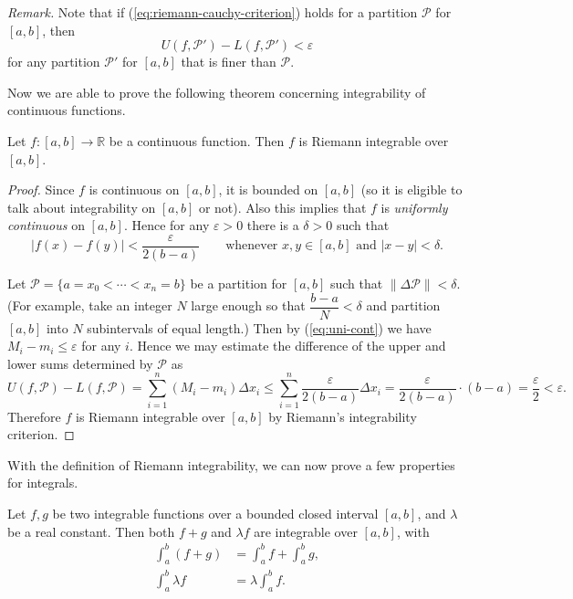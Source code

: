 \noindent\textit{Remark.} Note that if (\ref{eq:riemann-cauchy-criterion}) holds for a partition $\mathcal{P}$ for $[a,b]$, then
\[
  U(f,\mathcal{P}') - L(f,\mathcal{P}') < \varepsilon
\]
for any partition $\mathcal{P}'$ for $[a,b]$ that is finer than $\mathcal{P}$.

Now we are able to prove the following theorem concerning integrability of continuous functions.

\begin{thm}
  Let $f: [a,b] \to \mathbb{R}$ be a continuous function.
  Then $f$ is Riemann integrable over $[a,b]$.
\end{thm}

\begin{proof}
  Since $f$ is continuous on $[a,b]$, it is bounded on $[a,b]$ (so it is eligible to talk about integrability on $[a,b]$ or not).
  Also this implies that $f$ is \textit{uniformly continuous} on $[a,b]$.
  Hence for any $\varepsilon > 0$ there is a $\delta > 0$ such that 
  \begin{equation}
    \label{eq:uni-cont}
    |f(x) - f(y)| < \frac{\varepsilon}{2(b-a)} \qquad \text{whenever $x,y \in [a,b]$ and $|x-y| < \delta$.}
  \end{equation}

  Let $\mathcal{P} = \{ a = x_0 < \cdots < x_n = b \}$ be a partition for $[a,b]$ such that $\| \Delta \mathcal{P} \| < \delta$. (For example, take an integer $N$ large enough so that $\dfrac{b-a}{N} < \delta$ and partition $[a,b]$ into $N$ subintervals of equal length.)
  Then by (\ref{eq:uni-cont}) we have $M_i - m_i \leqslant \varepsilon$ for any $i$.
  Hence we may estimate the difference of the upper and lower sums determined by $\mathcal{P}$ as
  \[
    U(f,\mathcal{P}) - L(f,\mathcal{P}) = \sum_{i=1}^n (M_i - m_i) \Delta x_i \leqslant \sum_{i=1}^n \frac{\varepsilon}{2(b-a)} \Delta x_i = \frac{\varepsilon}{2 (b-a)} \cdot (b-a) = \frac{\varepsilon}{2} < \varepsilon.
  \]
  Therefore $f$ is Riemann integrable over $[a,b]$ by Riemann's integrability criterion.
\end{proof}

With the definition of Riemann integrability, we can now prove a few properties for integrals.

\begin{thm}
  \label{thm:int-linearity}
  Let $f, g$ be two integrable functions over a bounded closed interval $[a,b]$, and $\lambda$ be a real constant.
  Then both $f+g$ and $\lambda f$ are integrable over $[a,b]$, with
  \begin{align*}
    \int_a^b (f+g) &= \int_a^b f + \int_a^b g, \\
    \int_a^b \lambda f &= \lambda \int_a^b f.
  \end{align*}
\end{thm}

